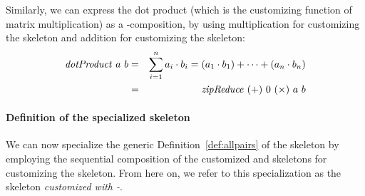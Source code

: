 Similarly, we can express the dot product (which is the customizing function of matrix multiplication) as a \zip-\reduce composition, by using multiplication for customizing the \zip skeleton and addition for customizing the \reduce skeleton:
\begin{eqnarray*}
  \mbox{\emph{dotProduct}}\ a\ b &=& \sum_{i = 1}^{n} a_i \cdot b_i = (a_1 \cdot b_1) + \cdots + (a_n \cdot b_n)\\
  &=& \text{\textit{zipReduce}}\ (+)\ 0\ (\times)\ a\ b
\end{eqnarray*}

\paragraph{Definition of the specialized \allpairs skeleton}

We can now specialize the generic Definition~\autoref{def:allpairs} of the \allpairs skeleton by employing the sequential composition of the customized \reduce and \zip skeletons for customizing the \allpairs skeleton.
From here on, we refer to this specialization as the \allpairs skeleton \emph{customized with \zip-\reduce}.


